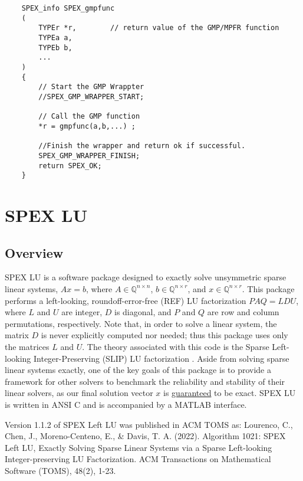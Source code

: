 \documentclass[12pt]{report}
\theoremstyle{definition}
\begin{document}
\begin{mdframed}[userdefinedwidth=6in]
{\footnotesize
\begin{verbatim}
    SPEX_info SPEX_gmpfunc
    (
        TYPEr *r,        // return value of the GMP/MPFR function
        TYPEa a,
        TYPEb b,
        ...
    )
    {
        // Start the GMP Wrappter
        //SPEX_GMP_WRAPPER_START;
    
        // Call the GMP function
        *r = gmpfunc(a,b,...) ;
    
        //Finish the wrapper and return ok if successful.
        SPEX_GMP_WRAPPER_FINISH;
        return SPEX_OK;
    }
\end{verbatim}
} \end{mdframed}


\chapter{SPEX LU} \label{ch:LeftLU}

\section{Overview} \label{s:LeftLU:intro}
SPEX LU is a software package designed to exactly solve unsymmetric sparse
linear systems, $ A x = b$, where $A \in \mathbb{Q}^{n \times
n}$, $b \in \mathbb{Q}^{n \times r}$, and $x \in \mathbb{Q}^{n \times
r}$. This package performs a left-looking, roundoff-error-free (REF) LU
factorization $P A Q = L D U$, where $L$ and $U$ are integer, $D$ is diagonal,
and $P$ and $Q$ are row and column permutations, respectively. 
Note that, in order to solve a linear system, the matrix $D$ is never explicitly computed nor needed; thus this 
package uses only the matrices $L$ and $U$. The theory associated with this code is the Sparse Left-looking Integer-Preserving (SLIP) LU factorization
 \cite{lourenco2019exact}. Aside from
solving sparse linear systems exactly, one of the key goals of this package is
to provide a framework for other solvers to benchmark the reliability and
stability of their linear solvers, as our final solution vector $x$ is
\ul{guaranteed} to be exact. SPEX LU is written in ANSI C and is accompanied by a MATLAB interface.

Version 1.1.2 of SPEX Left LU was published in ACM TOMS as:
Lourenco, C., Chen, J., Moreno-Centeno, E., \& Davis, T. A. (2022). Algorithm 1021: SPEX Left LU, Exactly Solving Sparse Linear Systems via a Sparse Left-looking Integer-preserving LU Factorization. ACM Transactions on Mathematical Software (TOMS), 48(2), 1-23.
\end{document}
